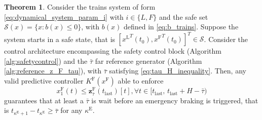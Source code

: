 \documentclass[letterpaper, 10 pt, conference]{ieeeconf}
\theoremstyle{definition}
\theoremstyle{nopoint}
\newtheorem{theorem}{Theorem}[section]
\newcounter{Theorem}
\begin{document}
\begin{theorem}\label{thm:tau_far_control}
Consider the trains system of form \eqref{eq:dynamical_system_param_i} with $i\in\{L,F\}$ and the safe set $\mathcal{S}(x)=\{x: b(x)\leq 0\}$, with $b(x)$ defined in \eqref{eq:b_trains}. 
Suppose the system starts in a safe state, that is $[{x^\mathrm{L}}^T(t_0),{x^\mathrm{F}}^T(t_0)]^T\in\mathcal{S}$. Consider the control architecture encompassing  the safety control block (Algorithm \ref{alg:safetycontrol}) and the $\bar{\tau}$ far reference generator (Algorithm \ref{alg:reference_z_F_tau}), with $\bar{\tau}$ satisfying \eqref{eq:tau_H_inequality}. Then, any valid predictive controller $K^\mathrm{F}(x^\mathrm{F})$ able to enforce
\begin{equation}\label{eq:tau_far_constraint}
x_1^\mathrm{F}(t)\leq  \mathbf{z}_{\bar{\tau}}^\mathrm{F}(t_{\mathrm{last}})[t], \forall t \in [t_{\mathrm{last}}, \, t_{\mathrm{last}}+H-\bar{\tau})
\end{equation} 
guarantees that at least a $\bar{\tau}$ is wait before an emergency braking is triggered, that is
$ t_{\kappa^\mathrm{E} +1} -t_{\kappa^\mathrm{E}}\geq \bar{\tau}$ for any  $\kappa^\mathrm{E}$.

\end{theorem}
 
\end{document}
